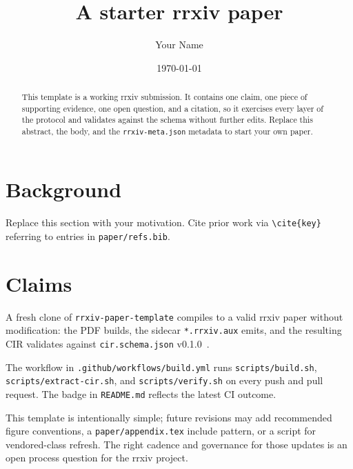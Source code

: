 \documentclass{rrxiv}
\title{A starter rrxiv paper}
\author{Your Name}
\date{\today}
\begin{document}
\maketitle

\begin{abstract}
This template is a working rrxiv submission. It contains one claim, one
piece of supporting evidence, one open question, and a citation, so it
exercises every layer of the protocol and validates against the schema
without further edits. Replace this abstract, the body, and the
\texttt{rrxiv-meta.json} metadata to start your own paper.
\end{abstract}

\section{Background}
\label{sec:background}

Replace this section with your motivation. Cite prior work via
\verb|\cite{key}| referring to entries in \texttt{paper/refs.bib}.

\section{Claims}
\label{sec:claims}

\begin{claim}
\label{claim:hello}
A fresh clone of \texttt{rrxiv-paper-template} compiles to a valid
rrxiv paper without modification: the PDF builds, the sidecar
\texttt{*.rrxiv.aux} emits, and the resulting CIR validates against
\texttt{cir.schema.json} v0.1.0~\cite{rrxiv-cir-schema}.
\end{claim}

\begin{evidence}
\label{ev:ci}
The workflow in \texttt{.github/workflows/build.yml} runs
\texttt{scripts/build.sh}, \texttt{scripts/extract-cir.sh}, and
\texttt{scripts/verify.sh} on every push and pull request. The badge in
\texttt{README.md} reflects the latest CI outcome.
\end{evidence}

\begin{openquestion}
\label{oq:versioning}
This template is intentionally simple; future revisions may add
recommended figure conventions, a \texttt{paper/appendix.tex} include
pattern, or a script for vendored-class refresh. The right cadence and
governance for those updates is an open process question for the rrxiv
project.
\end{openquestion}



\end{document}
